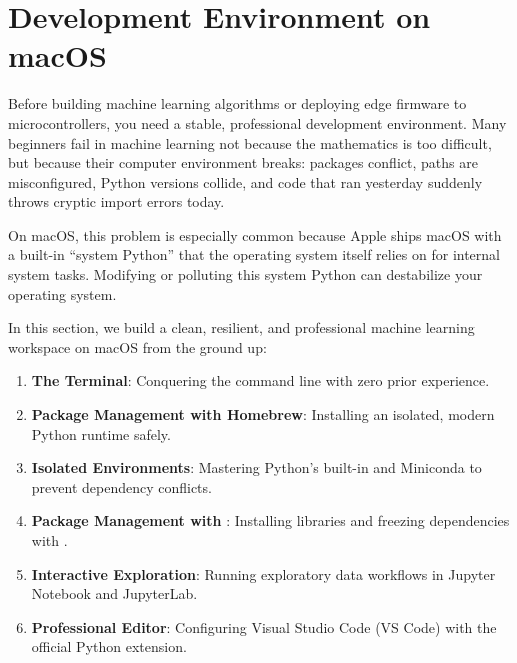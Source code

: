 \section{Development Environment on macOS}\label{sec:dev_environment_macos}

Before building machine learning algorithms or deploying edge firmware to microcontrollers, you need a stable, professional development environment. Many beginners fail in machine learning not because the mathematics is too difficult, but because their computer environment breaks: packages conflict, paths are misconfigured, Python versions collide, and code that ran yesterday suddenly throws cryptic import errors today.

On macOS, this problem is especially common because Apple ships macOS with a built-in ``system Python'' that the operating system itself relies on for internal system tasks. Modifying or polluting this system Python can destabilize your operating system.

In this section, we build a clean, resilient, and professional machine learning workspace on macOS from the ground up:
\begin{enumerate}
    \item \textbf{The Terminal}: Conquering the command line with zero prior experience.
    \item \textbf{Package Management with Homebrew}: Installing an isolated, modern Python runtime safely.
    \item \textbf{Isolated Environments}: Mastering Python's built-in  and Miniconda to prevent dependency conflicts.
    \item \textbf{Package Management with }: Installing libraries and freezing dependencies with .
    \item \textbf{Interactive Exploration}: Running exploratory data workflows in Jupyter Notebook and JupyterLab.
    \item \textbf{Professional Editor}: Configuring Visual Studio Code (VS Code) with the official Python extension.
\end{enumerate}

